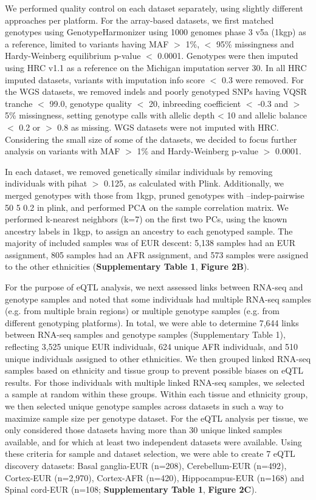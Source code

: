 We performed quality control on each dataset separately, using slightly different approaches per platform. For the array-based datasets, we first matched genotypes using GenotypeHarmonizer\cite{deelenGenotypeHarmonizerAutomatic2014} using 1000 genomes phase 3 v5a (1kgp) as a reference, limited to variants having MAF $>$ 1\%, $<$ 95\% missingness and Hardy-Weinberg equilibrium p-value $<$ 0.0001. Genotypes were then imputed using HRC v1.1 as a reference on the Michigan imputation server 30. In all HRC imputed datasets, variants with imputation info score $<$ 0.3 were removed. For the WGS datasets, we removed indels and poorly genotyped SNPs having VQSR tranche $<$ 99.0, genotype quality $<$ 20, inbreeding coefficient $<$ -0.3 and $>$ 5\% missingness, setting genotype calls with allelic depth < 10 and allelic balance $<$ 0.2 or $>$ 0.8 as missing. WGS datasets were not imputed with HRC. Considering the small size of some of the datasets, we decided to focus further analysis on variants with MAF $>$ 1\% and Hardy-Weinberg p-value $>$ 0.0001. 

In each dataset, we removed genetically similar individuals by removing individuals with pihat $>$ 0.125, as calculated with Plink. Additionally, we merged genotypes with those from 1kgp, pruned genotypes with --indep-pairwise 50 5 0.2 in plink, and performed PCA on the sample correlation matrix. We performed k-nearest neighbors (k=7) on the first two PCs, using the known ancestry labels in 1kgp, to assign an ancestry to each genotyped sample. The majority of included samples was of EUR descent: 5,138 samples had an EUR assignment, 805 samples had an AFR assignment, and 573 samples were assigned to the other ethnicities (\textbf{Supplementary Table 1}, \textbf{Figure 2B}). 

For the purpose of eQTL analysis, we next assessed links between RNA-seq and genotype samples and noted that some individuals had multiple RNA-seq samples (e.g. from multiple brain regions) or multiple genotype samples (e.g. from different genotyping platforms). In total, we were able to determine 7,644 links between RNA-seq samples and genotype samples (Supplementary Table 1), reflecting 3,525 unique EUR individuals, 624 unique AFR individuals, and 510 unique individuals assigned to other ethnicities. We then grouped linked RNA-seq samples based on ethnicity and tissue group to prevent possible biases on eQTL results. For those individuals with multiple linked RNA-seq samples, we selected a sample at random within these groups. Within each tissue and ethnicity group, we then selected unique genotype samples across datasets in such a way to maximize sample size per genotype dataset. For the eQTL analysis per tissue, we only considered those datasets having more than 30 unique linked samples available, and for which at least two independent datasets were available. Using these criteria for sample and dataset selection, we were able to create 7 eQTL discovery datasets: Basal ganglia-EUR (n=208), Cerebellum-EUR (n=492), Cortex-EUR (n=2,970), Cortex-AFR (n=420), Hippocampus-EUR (n=168) and Spinal cord-EUR (n=108; \textbf{Supplementary Table 1}, \textbf{Figure 2C}). 


